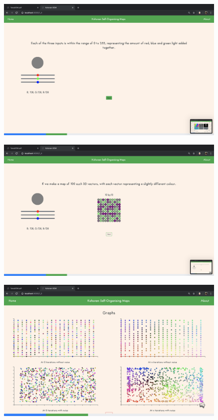 \documentclass[fleqn, journal, onecolumn]{IEEEtran}             %
\theoremstyle{break}                                            %
\begin{document}
      \begin{figure}[h!]
        \centering
        \includegraphics[width=\textwidth]{Tesis6}
      \end{figure}

      \begin{figure}[h!]
        \centering
        \includegraphics[width=\textwidth]{Tesis7}
      \end{figure}

      \begin{figure}[h!]
        \centering
        \includegraphics[width=\textwidth]{Tesis8}
      \end{figure}
\end{document}
